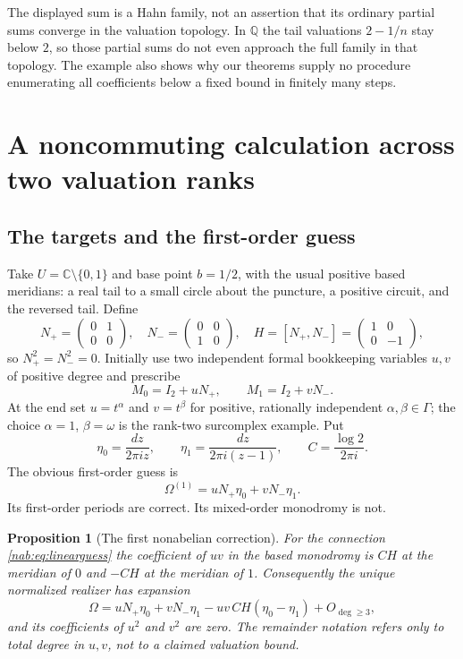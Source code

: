 \documentclass[11pt,letterpaper]{article}
\newtheorem{proposition}[proposition]{Proposition}
\theoremstyle{definition}
\theoremstyle{remark}
\newcommand{\C}{\mathbb C}
\newcommand{\Q}{\mathbb Q}
\numberwithin{equation}{section}
\begin{document}
The displayed sum is a Hahn family, not an assertion that its ordinary partial
sums converge in the valuation topology. In $\Q$ the tail valuations $2-1/n$
stay below $2$, so those partial sums do not even approach the full family in
that topology. The example also shows why our theorems supply no procedure
enumerating all coefficients below a fixed bound in finitely many steps.

\section{A noncommuting calculation across two valuation ranks}
\label{nab:sec:mixed}

\subsection{The targets and the first-order guess}

Take $U=\C\setminus\{0,1\}$ and base point $b=1/2$, with the usual positive
based meridians: a real tail to a small circle about the puncture, a positive
circuit, and the reversed tail. Define
\[
 N_+=\begin{pmatrix}0&1\\0&0\end{pmatrix},\quad
 N_-=\begin{pmatrix}0&0\\1&0\end{pmatrix},\quad
 H=[N_+,N_-]=\begin{pmatrix}1&0\\0&-1\end{pmatrix},
\]
so $N_+^2=N_-^2=0$. Initially use two independent formal bookkeeping variables
$u,v$ of positive degree and prescribe
\begin{equation}\label{nab:eq:twotargets}
 M_0=I_2+uN_+,\qquad M_1=I_2+vN_-.
\end{equation}
At the end set $u=t^\alpha$ and $v=t^\beta$ for positive, rationally
independent $\alpha,\beta\in\Gamma$; the choice $\alpha=1$, $\beta=\omega$ is
the rank-two surcomplex example. Put
\[
 \eta_0=\frac{dz}{2\pi iz},\qquad
 \eta_1=\frac{dz}{2\pi i(z-1)},\qquad
 C=\frac{\log2}{2\pi i}.
\]
The obvious first-order guess is
\begin{equation}\label{nab:eq:linearguess}
 \Omega^{(1)}=uN_+\eta_0+vN_-\eta_1.
\end{equation}
Its first-order periods are correct. Its mixed-order monodromy is not.

\begin{proposition}[The first nonabelian correction]\label{nab:prop:mixed}
For the connection \eqref{nab:eq:linearguess} the coefficient of $uv$ in the
based monodromy is $CH$ at the meridian of $0$ and $-CH$ at the meridian of
$1$. Consequently the unique normalized realizer has expansion
\begin{equation}\label{nab:eq:mixedconnection}
 \Omega=uN_+\eta_0+vN_-\eta_1-uv\,CH(\eta_0-\eta_1)+O_{\deg\geq3},
\end{equation}
and its coefficients of $u^2$ and $v^2$ are zero. The remainder notation refers
only to total degree in $u,v$, not to a claimed valuation bound.
\end{proposition}
\end{document}
